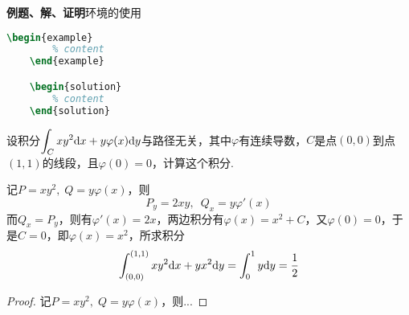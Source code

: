 \documentclass[12pt, a4paper, oneside, UTF8]{ctexbook}
\begin{document}

\textbf{例题、解、证明}环境的使用
\begin{lstlisting}[language=TeX]
    \begin{example}
        % content
    \end{example}

    \begin{solution}
        % content
    \end{solution}
\end{lstlisting}

\begin{example}
    设积分$\displaystyle\int_C xy^2\mathrm{d} x +y \varphi(x)\mathrm{d} y$与路径无关，其中$\varphi$有连续导数，$C$是点$(0,0)$到点$(1,1)$的线段，且$\varphi(0)=0$，计算这个积分.
\end{example}
\begin{solution}
    记$P = xy^2,\; Q = y\varphi(x)$，则
    \[
        P_y =2xy ,\enspace Q_x = y\varphi'(x)
    \]
    而$Q_x = P_y$，则有$\varphi'(x) = 2x$，两边积分有$\varphi(x) = x^2+C$，又$\varphi(0)=0$，于是$C=0$，即$\varphi(x) = x^2$，所求积分
    \[
        \int_{(0,0)}^{(1,1)} xy^2\mathrm{d} x +y x^2\mathrm{d} y  = \int_0^1 y \mathrm{d} y = \frac{1}{2}
    \]
\end{solution}

\begin{proof}
    记$P = xy^2,\; Q = y\varphi(x)$，则...
\end{proof}

\ifx\allfiles\undefined
\end{document}
